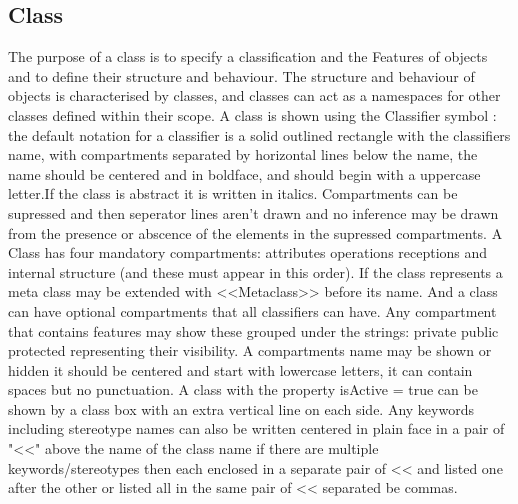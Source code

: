 \subsection{Class}
The purpose of a class is to specify a classification and the Features of objects and to define their structure and behaviour. The structure and behaviour of objects is characterised by classes, and classes can act as a namespaces for other classes defined within their scope. A class is shown using the Classifier symbol : the default notation for a classifier is a solid outlined rectangle with the classifiers name, with compartments separated by horizontal lines below the name, the name should be centered and in boldface, and should begin with a uppercase letter.If the class is abstract it is written in italics. Compartments can be supressed and then seperator lines aren't drawn and no inference may be drawn from the presence or abscence of the elements in the supressed compartments. A Class has four mandatory compartments: attributes operations receptions and internal structure (and these must appear in this order). If the class represents a meta class may be extended with <<Metaclass>> before its name. And a class can have optional compartments that all classifiers can have. Any compartment that contains features may show these grouped under the strings: private public protected representing their visibility. A compartments name may be shown or hidden it should be centered and start with lowercase letters, it can contain spaces but no punctuation. A class with the property isActive = true can be shown by a class box with an extra vertical line on each side. Any keywords including stereotype names can also be written centered in plain face in a pair of "<<" above the name of the class name if there are multiple keywords/stereotypes then each enclosed in a separate pair of << and listed one after the other or listed all in the same pair of << separated be commas.
